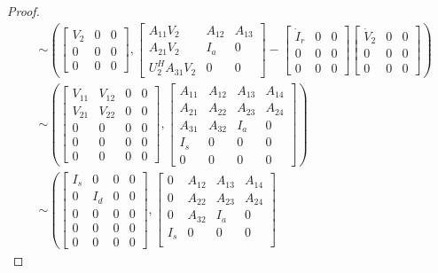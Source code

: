\documentclass[]{book}
\theoremstyle{definition}
\theoremstyle{definition}
\theoremstyle{definition}
\theoremstyle{remark}
\begin{document}
\begin{proof}
\begin{align*}
& \sim   
\left(\begin{bmatrix}
V_2 & 0 & 0 \\
0 & 0 & 0 \\
0 & 0 & 0
\end{bmatrix},
\begin{bmatrix}
A_{11}V_2 & A_{12} & A_{13}\\
A_{21}V_2 & I_a & 0 \\
U_2^HA_{31}V_2 & 0 & 0
\end{bmatrix}
-
\begin{bmatrix}
\dot I_r & 0 & 0 \\
0 & 0 & 0 \\
0 & 0 & 0
\end{bmatrix}
\begin{bmatrix}
\dot V_2 & 0 & 0 \\
0 & 0 & 0 \\
0 & 0 & 0
\end{bmatrix} \right)\\
& \sim   
\left(\begin{bmatrix}
V_{11} & V_{12} & 0 & 0 \\
V_{21} & V_{22} & 0 & 0 \\
0 & 0 & 0 & 0 \\
0 & 0 & 0 & 0 \\
0 & 0 & 0 & 0
\end{bmatrix},
\begin{bmatrix}
A_{11} & A_{12} & A_{13} & A_{14}  \\
A_{21} & A_{22} & A_{23} & A_{24}  \\
A_{31} & A_{32} & I_a & 0 \\
I_s & 0 & 0 & 0 \\
0 & 0 & 0 & 0
\end{bmatrix} \right)\\
& \sim   
\left(\begin{bmatrix}
I_s & 0 & 0 & 0 \\
0 & I_d & 0 & 0 \\
0 & 0 & 0 & 0 \\
0 & 0 & 0 & 0 \\
0 & 0 & 0 & 0
\end{bmatrix},
\begin{bmatrix}
0 & A_{12} & A_{13} & A_{14}  \\
0 & A_{22} & A_{23} & A_{24}  \\
0 & A_{32} & I_a & 0 \\
I_s & 0 & 0 & 0 \\

\end{bmatrix}
\end{align*}
\end{proof}
\end{document}
